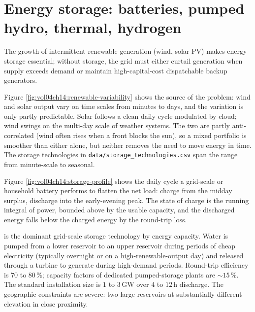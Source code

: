 \section{Energy storage: batteries, pumped hydro, thermal, hydrogen}

The growth of intermittent renewable generation (wind, solar PV)
makes energy storage essential; without storage, the grid must
either curtail generation when supply exceeds demand or maintain
high-capital-cost dispatchable backup generators.



Figure \ref{fig:vol04ch14:renewable-variability} shows the source of
the problem: wind and solar output vary on time scales from minutes to
days, and the variation is only partly predictable. Solar follows a
clean daily cycle modulated by cloud; wind swings on the multi-day
scale of weather systems. The two are partly anti-correlated (wind
often rises when a front blocks the sun), so a mixed portfolio is
smoother than either alone, but neither removes the need to move energy
in time. The storage technologies in \texttt{data/storage\_technologies.csv}
span the range from minute-scale to seasonal.



Figure \ref{fig:vol04ch14:storage-profile} shows the daily cycle a
grid-scale or household battery performs to flatten the net load:
charge from the midday surplus, discharge into the early-evening peak.
The state of charge is the running integral of power, bounded above by
the usable capacity, and the discharged energy falls below the charged
energy by the round-trip loss.

 is the dominant grid-scale
storage technology by energy capacity. Water is pumped from a lower
reservoir to an upper reservoir during periods of cheap electricity
(typically overnight or on a high-renewable-output day) and released
through a turbine to generate during high-demand periods. Round-trip
efficiency is $70$ to $80\,\%$; capacity factors of dedicated
pumped-storage plants are $\sim 15\,\%$. The standard installation
size is $1$ to $3\,\si{\giga\watt}$ over $4$ to $12\,\si{\hour}$
discharge. The geographic constraints are severe: two large
reservoirs at substantially different elevation in close proximity.


